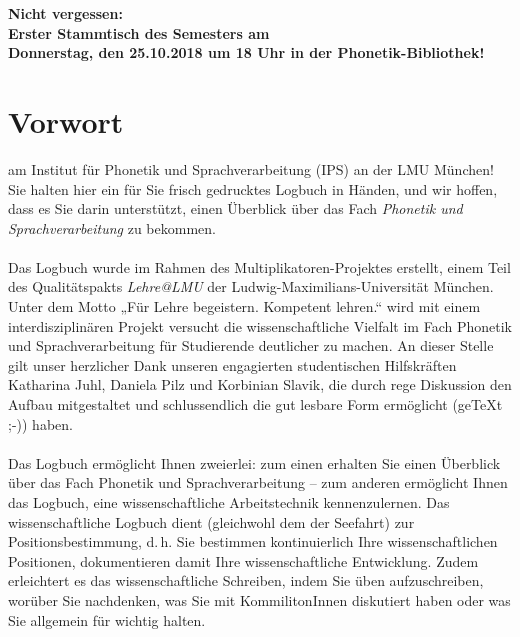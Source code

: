 \documentclass[11pt]{book}
\begin{document}
\begin{titlepage}
\begin{center}
\newpage

\textbf {Nicht vergessen:\\Erster Stammtisch des Semesters am\\Donnerstag, den 25.10.2018 um 18 Uhr in der Phonetik-Bibliothek!}

\end{center}
\end{titlepage}
\thispagestyle{empty}
\tableofcontents

\chapter{Vorwort}
 am Institut für Phonetik und Sprachverarbeitung (IPS) an der LMU München!
Sie halten hier ein für Sie frisch gedrucktes Logbuch in Händen, und wir hoffen, dass es Sie darin unterstützt, einen Überblick über das Fach \emph{Phonetik und Sprachverarbeitung} zu bekommen.\\
\\
Das Logbuch wurde im Rahmen des Multiplikatoren-Projektes erstellt, einem Teil des Qualitätspakts \emph{Lehre@LMU} der Ludwig-Maximilians-Universität München. Unter dem Motto „Für Lehre begeistern. Kompetent lehren.“ wird mit einem interdisziplinären Projekt versucht die wissenschaftliche Vielfalt im Fach Phonetik und Sprachverarbeitung für Studierende deutlicher zu machen. An dieser Stelle gilt unser herzlicher Dank unseren engagierten studentischen Hilfskräften Katharina Juhl, Daniela Pilz und Korbinian Slavik, die durch rege Diskussion den Aufbau mitgestaltet und schlussendlich die gut lesbare Form ermöglicht (ge\TeX{}t ;-)) haben.\\
\\
Das Logbuch ermöglicht Ihnen zweierlei: zum einen erhalten Sie einen Überblick über das Fach Phonetik und Sprachverarbeitung – zum anderen ermöglicht Ihnen das Logbuch, eine wissenschaftliche Arbeitstechnik kennenzulernen. Das wissenschaftliche Logbuch dient (gleichwohl dem der Seefahrt) zur Positionsbestimmung, d.\,h. Sie bestimmen kontinuierlich Ihre wissenschaftlichen Positionen, dokumentieren damit Ihre wissenschaftliche Entwicklung. Zudem erleichtert es das wissenschaftliche Schreiben, indem Sie üben aufzuschreiben, worüber Sie nachdenken, was Sie mit KommilitonInnen diskutiert haben oder was Sie allgemein für wichtig halten.\\
\\
\end{document}
